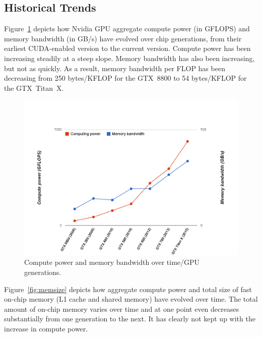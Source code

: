 \subsection{Historical Trends}  \label{GPUArchTrends}

Figure~\ref{fig:compute-power} depicts how Nvidia GPU aggregate compute power (in GFLOPS) and memory
bandwidth (in GB/s) have evolved over chip generations, from their earliest CUDA-enabled version to the current
version.
Compute power has been increasing steadily at a steep slope.
Memory bandwidth has also been increasing, but not as quickly.
As a result, memory bandwidth per FLOP has been decreasing from 250 bytes/KFLOP for the GTX~8800 to
54 bytes/KFLOP for the GTX~Titan~X.

\begin{figure}
\center
\includegraphics[scale=0.26]{computevsmemory.png}
\caption{\footnotesize\textnormal{Compute power and memory bandwidth over time/GPU generations.}}
\label{fig:compute-power}
\end{figure}

Figure~\ref{fig:memsize} depicts how aggregate compute power and total size of fast on-chip memory (L1 cache and shared memory) have evolved over time.
The total amount of on-chip memory varies over time and at one point even decreases substantially from one generation to the next.
It has clearly not kept up with the increase in compute power. 

